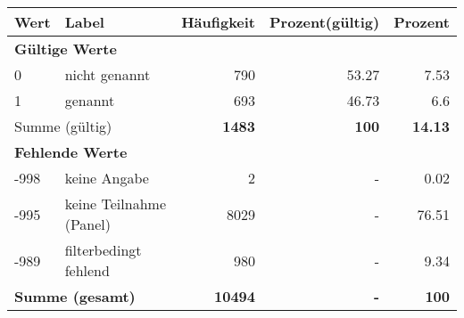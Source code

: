      \begin{longtable}{lXrrr}
     \toprule
     \textbf{Wert} & \textbf{Label} & \textbf{Häufigkeit} & \textbf{Prozent(gültig)} & \textbf{Prozent} \\
     \endhead
     \midrule
     \multicolumn{5}{l}{\textbf{Gültige Werte}}\\

     0 &
     \multicolumn{1}{X}{ nicht genannt   } &


       \num{790} &
       \num[round-mode=places,round-precision=2]{53.27} &
         \num[round-mode=places,round-precision=2]{7.53} \\

     1 &
     \multicolumn{1}{X}{ genannt   } &


       \num{693} &
       \num[round-mode=places,round-precision=2]{46.73} &
         \num[round-mode=places,round-precision=2]{6.6} \\
     \midrule
     \multicolumn{2}{l}{Summe (gültig)} &
       \textbf{\num{1483}} &
     \textbf{\num{100}} &
       \textbf{\num[round-mode=places,round-precision=2]{14.13}} \\
     \multicolumn{5}{l}{\textbf{Fehlende Werte}}\\
       -998 &
       keine Angabe &
         \num{2} &
        - &
         \num[round-mode=places,round-precision=2]{0.02} \\
       -995 &
       keine Teilnahme (Panel) &
         \num{8029} &
        - &
         \num[round-mode=places,round-precision=2]{76.51} \\
       -989 &
       filterbedingt fehlend &
         \num{980} &
        - &
         \num[round-mode=places,round-precision=2]{9.34} \\
     \midrule
     \multicolumn{2}{l}{\textbf{Summe (gesamt)}} &
          \textbf{\num{10494}} &
        \textbf{-} &
        \textbf{\num{100}} \\
     \bottomrule
     \end{longtable}
     
